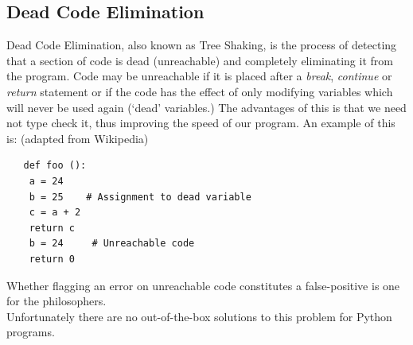 \documentclass[12pt, titlepage]{article}
\begin{document}
\subsection{Dead Code Elimination}
Dead Code Elimination, also known as Tree Shaking, is the process of detecting that a section of code is dead (unreachable) and completely eliminating it from the program. Code may be unreachable if it is placed after a \textit{break}, \textit{continue} or \textit{return} statement or if the code has the effect of only modifying variables which will never be used again (`dead' variables.) The advantages of this is that we need not type check it, thus improving the speed of our program.
An example of this is: (adapted from Wikipedia)
\begin{lstlisting}
   def foo ():
   	a = 24
   	b = 25    # Assignment to dead variable
   	c = a + 2
   	return c
   	b = 24 	   # Unreachable code
   	return 0
\end{lstlisting}
Whether flagging an error on unreachable code constitutes a false-positive is one for the philosophers. \\
Unfortunately there are no out-of-the-box solutions to this problem for Python programs. \\
\end{document}

